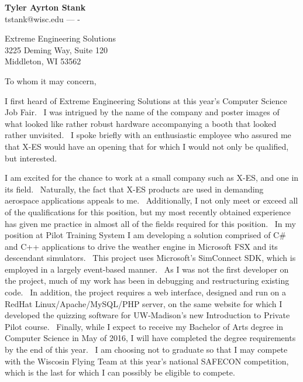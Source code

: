 \documentclass[12pt,letterpaper]{article}
\begin{document}
\thispagestyle{empty}

\begin{centering}
    {\large \textbf{Tyler Ayrton Stank}}\\
    tstank@wisc.edu ---  -\\
\end{centering}
Extreme Engineering Solutions\\
3225 Deming Way, Suite 120\\
Middleton, WI 53562


\par To whom it may concern,

\par I first heard of Extreme Engineering Solutions at this year's Computer Science Job Fair.~
    I was intrigued by the name of the company and poster images of what looked like rather robust hardware accompanying a booth that looked rather unvisited.~
    I spoke briefly with an enthusiastic employee who assured me that X-ES would have an opening that for which I would not only be qualified, but interested.~

\par I am excited for the chance to work at a small company such as X-ES, and one in its field.~
    Naturally, the fact that X-ES products are used in demanding aerospace applications appeals to me.~
    Additionally, I not only meet or exceed all of the qualifications for this position, but my most recently obtained experience has given me practice in almost all of the fields required for this position.~
    In my position at Pilot Training System I am developing a solution comprised of C\# and C++ applications to drive the weather engine in Microsoft FSX and its descendant simulators.~
    This project uses Microsoft's SimConnect SDK, which is employed in a largely event-based manner.~
    As I was not the first developer on the project, much of my work has been in debugging and restructuring existing code.~
    In addition, the project requires a web interface, designed and run on a RedHat Linux/Apache/MySQL/PHP server, on the same website for which I developed the quizzing software for UW-Madison's new Introduction to Private Pilot course.~
    Finally, while I expect to receive my Bachelor of Arts degree in Computer Science in May of 2016, I will have completed the degree requirements by the end of this year.~
    I am choosing not to graduate so that I may compete with the Wiscosin Flying Team at this year's national SAFECON competition, which is the last for which I can possibly be eligible to compete.
\end{document}
